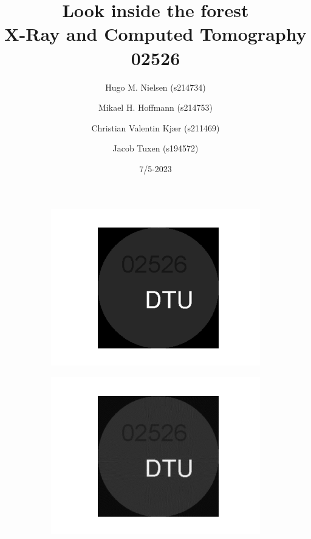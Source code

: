 \documentclass{article}
\title{
    Look inside the forest \\
    \large X-Ray and Computed Tomography \\
    02526
}
\author{Hugo M. Nielsen (s214734) \and Mikael H. Hoffmann (s214753) \and Christian Valentin Kjær (s211469) \and Jacob Tuxen (s194572)}
\date{7/5-2023}
\begin{document}
\maketitle\thispagestyle{empty}

\vspace{70pt}

\begin{figure}[H]
\centering
\begin{subfigure}[t]{0.3\linewidth}
\centering
\includegraphics[width=\linewidth]{code/test_logo.png}
\end{subfigure}
\begin{subfigure}[t]{0.4\linewidth}
\centering
\includegraphics[width=\linewidth]{code/test_logo_recov.png}

\end{subfigure}
\end{figure}
\end{document}
